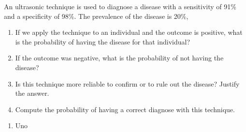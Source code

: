 
\begin{question}
An ultrasonic technique is used to diagnose a disease with a sensitivity of 91\% and a specificity of 98\%.
The prevalence of the disease is 20\%, 
\begin{enumerate}
\item If we apply the technique to an individual and the outcome is positive, what is the probability of having the disease for that individual?
\item If the outcome was negative,  what is the probability of not having the disease?
\item Is this technique more reliable to confirm or to rule out the disease?
Justify the answer. 
\item Compute the probability of having a correct diagnose with this technique.
\end{enumerate}
\end{question}


\begin{solution}
\begin{enumerate}
\item Uno
\end{enumerate}
\end{solution}

 
